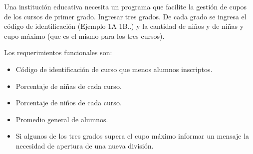 Una institución educativa necesita un programa que facilite la gestión de cupos de los cursos de primer grado. Ingresar tres grados. De cada grado se ingresa el código de identificación (Ejemplo 1A 1B..) y la cantidad de niños y de niñas y cupo máximo (que es el mismo para los tres cursos).

Los requerimientos funcionales son:

\begin{itemize}
	\item Código de identificación de curso que menos alumnos inscriptos.
	\item Porcentaje de niñas de cada curso.
	\item Porcentaje de niños de cada curso.
	\item Promedio general de alumnos.
	\item Si algunos de los tres grados supera el cupo máximo informar un mensaje la necesidad de apertura de una nueva división.
\end{itemize}
